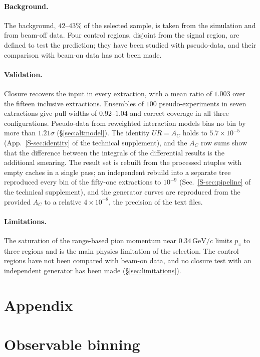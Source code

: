 \documentclass[11pt,a4paper]{article}
\newcommand{\GeVc}{\,\text{GeV}\!/c}
\newcommand{\suppref}[2]{#1~\ref{S-#2} of the technical supplement}
\begin{document}
\paragraph{Background.}
The background, $42$--$43\%$ of the selected sample, is taken from the simulation and from beam-off
data. Four control regions, disjoint from the signal region, are defined to test the prediction; they
have been studied with pseudo-data, and their comparison with beam-on data has not been made.

\paragraph{Validation.}
Closure recovers the input in every extraction, with a mean ratio of $1.003$ over the fifteen
inclusive extractions. Ensembles of $100$ pseudo-experiments in seven extractions give pull widths of
$0.92$--$1.04$ and correct coverage in all three configurations. Pseudo-data from reweighted
interaction models bias no bin by more than $1.21\sigma$ (\S\ref{sec:altmodel}). The identity $UR=A_C$ holds to
$5.7\times10^{-5}$ (\suppref{App.}{sec:identity}), and the $A_C$ row sums show that the difference
between the integrals of the differential results is the additional smearing. The result set is
rebuilt from the processed ntuples with empty caches in a single pass; an independent rebuild into a
separate tree reproduced every bin of the fifty-one extractions to $10^{-9}$
(\suppref{Sec.}{sec:pipeline}), and the generator curves are reproduced from the provided $A_C$ to a
relative $4\times10^{-8}$, the precision of the text files.

\paragraph{Limitations.}
The saturation of the range-based pion momentum near $0.34\GeVc$ limits $p_\pi$ to three regions and is
the main physics limitation of the selection. The control regions have not been compared with
beam-on data, and no closure test with an independent generator has been made
(\S\ref{sec:limitations}).



%
\section*{Appendix}
\appendix

\section{Observable binning}
\label{app:binning}
\end{document}
